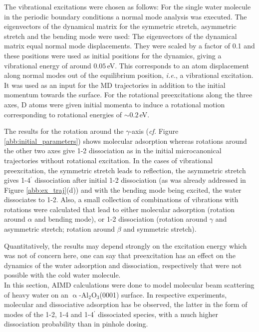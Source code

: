 \documentclass[11pt,DIV=13,BCOR=5mm,a4paper,headinclude]{scrbook}
\newcommand\todo[1]{\textcolor{red}{TODO: \textit{{#1}}}}
\begin{document}
The vibrational excitations were chosen as follows: For the single water molecule in the periodic boundary conditions a normal mode analysis was executed.
The eigenvectors of the dynamical matrix for the symmetric stretch, asymmetric stretch and the bending mode were used: The eigenvectors of the dynamical matrix equal normal mode displacements.
They were scaled by a factor of 0.1 and these positions were used as initial positions for the dynamics, giving a vibrational energy of around $0.05\,$eV. %
This corresponds to an atom displacement along normal modes out of the equilibrium position, \textit{i.e.}, a vibrational excitation.
It was used as an input for the MD trajectories in addition to the initial momentum towards the surface.
For the rotational preexcitations along the three axes, D atoms were given initial momenta to induce a rotational motion corresponding to rotational energies of $\sim 0.2\,$eV.


The results for the rotation around the $\gamma$-axis (\textit{cf.} Figure \ref{abb:initial_parameters}) shows molecular adsorption whereas rotations around the other two axes give 1-2 dissociation as in the initial microcanonical trajectories without rotational excitation.
In the cases of vibrational preexcitation, the symmetric stretch leads to reflection, the asymmetric stretch gives 1-4$^\prime$ dissociation after initial 1-2 dissociation (as was already addressed in Figure \ref{abb:ex_traj}(d)) and with the bending mode being excited, the water dissociates to 1-2.
Also, a small collection of combinations of vibrations with rotations were calculated that lead to either molecular adsorption (rotation around $\alpha$ and bending mode), or 1-2 dissociation (rotation around $\gamma$ and asymmetric stretch; rotation around $\beta$ and symmetric stretch).


Quantitatively, the results may depend strongly on the excitation energy which was not of concern here, one can say that preexcitation has an effect on the dynamics of the water adsorption and dissociation, respectively that were not possible with the cold water molecule.
\\


In this section, AIMD calculations were done to model molecular beam scattering of heavy water on an $\upalpha$-Al$_2$O$_3$(0001) surface.
In respective experiments, molecular and dissociative adsorption has be observed, the latter in the form of modes of the 1-2, 1-4 and 1-4$^\prime$ dissociated species, with a much higher dissociation probability than in pinhole dosing.
\end{document}
